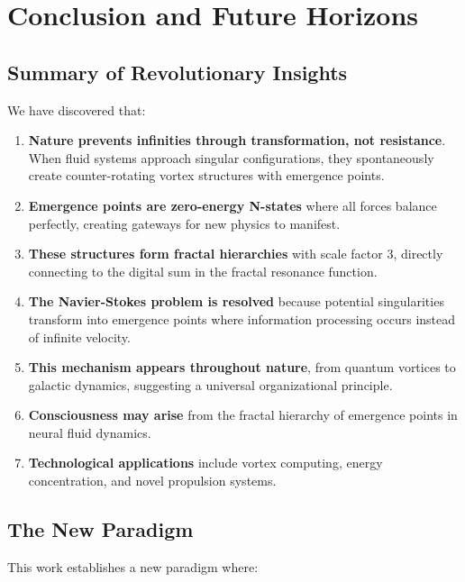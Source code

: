 \documentclass[12pt]{article}
\begin{document}
\section{Conclusion and Future Horizons}

\subsection{Summary of Revolutionary Insights}

We have discovered that:

\begin{enumerate}
\item \textbf{Nature prevents infinities through transformation, not resistance}. When fluid systems approach singular configurations, they spontaneously create counter-rotating vortex structures with emergence points.

\item \textbf{Emergence points are zero-energy N-states} where all forces balance perfectly, creating gateways for new physics to manifest.

\item \textbf{These structures form fractal hierarchies} with scale factor 3, directly connecting to the digital sum in the fractal resonance function.

\item \textbf{The Navier-Stokes problem is resolved} because potential singularities transform into emergence points where information processing occurs instead of infinite velocity.

\item \textbf{This mechanism appears throughout nature}, from quantum vortices to galactic dynamics, suggesting a universal organizational principle.

\item \textbf{Consciousness may arise} from the fractal hierarchy of emergence points in neural fluid dynamics.

\item \textbf{Technological applications} include vortex computing, energy concentration, and novel propulsion systems.
\end{enumerate}

\subsection{The New Paradigm}

This work establishes a new paradigm where:
\end{document}
